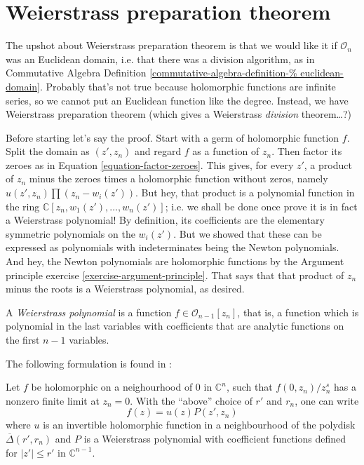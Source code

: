 \section{Weierstrass preparation theorem}
\label{section-weier-prepa-theor}

\noindent
The upshot about Weierstrass preparation
theorem is that
we would like it if $\mathcal{O}_n$ was an
Euclidean domain,
i.e. that there was a division algorithm,
as in Commutative Algebra Definition
\ref{commutative-algebra-definition-%
euclidean-domain}.
Probably that's not true because
holomorphic functions are infinite series,
so we cannot put an Euclidean function like
the degree.
Instead, we have Weierstrass preparation
theorem
(which gives a Weierstrass {\it division}
theorem…?)

\medskip\noindent
Before starting let's say the proof.
Start with a germ of holomorphic function
$f$.
Split the domain as $(z',z_n)$ and regard $f$
as a function of $z_n$.
Then factor its zeroes
as in Equation \ref{equation-factor-zeroes}.
This gives, for every $z'$,
a product of $z_n$ minus the zeroes times a
holomorphic function
without zeros, namely $u(z',z_n)\prod
(z_n-w_i(z'))$.
But hey, that product is a polynomial
function in the ring
$\mathbb{C}[z_n,w_1(z'),\ldots,w_n(z')]$;
i.e.
we shall be done once prove it is in fact a
Weierstrass polynomial!
By definition, its coefficients are the
elementary symmetric polynomials on the
$w_i(z')$.
But we showed that these can be expressed as
polynomials
with indeterminates being the Newton
polynomials.
And hey, the Newton polynomials are
holomorphic functions
by the Argument principle exercise
\ref{exercise-argument-principle}.
That says that that product of $z_n$ minus
the roots
is a Weierstrass polynomial, as desired.


\begin{definition}
\label{definition-weierstrass-polynomial}
A {\it Weierstrass polynomial} is a function
$f \in \mathcal{O}_{n-1}[z_n]$,
that is, a function which is polynomial in
the last variables with coefficients
that are analytic functions on the first
$n-1$ variables.
\end{definition}

\noindent
The following formulation is found in
\cite{Demailly}:

\begin{theorem}
\label{theorem-weier-prepa-theor}
Let $f$ be holomorphic on a neighourhood of
$0$ in $\mathbb{C}^n$,
such that $f(0,z_n)/z_n^s$ has a nonzero
finite limit at $z_n=0$.
With the ``above'' choice of $r'$ and $r_n$,
one can write
$$
f(z)=u(z)P(z',z_n)
$$
where $u$ is an invertible holomorphic
function
in a neighbourhood of the polydisk
$\overline{\Delta}(r',r_n)$
and $P$ is a Weierstrass polynomial with
coefficient
functions defined for $|z'|\leq r'$ in
$\mathbb{C}^{n-1}$.
\end{theorem}

